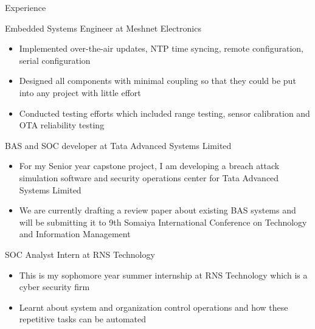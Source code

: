\documentclass{article}
\newlength{\tabin}
\newlength{\secsep}
\newcommand{\lineunder}{\vspace*{-8pt} \\ \hspace*{-6pt} \hrulefill \\ \vspace*{-15pt}}
\newenvironment{tabbedsection}[1]{
	\begin{list}{}{
		\setlength{\itemsep}{0pt}
		\setlength{\labelsep}{0pt}
		\setlength{\labelwidth}{0pt}
		\setlength{\leftmargin}{\tabin}
		\setlength{\rightmargin}{\tabin}
		\setlength{\listparindent}{0pt}
		\setlength{\parsep}{0pt}
		\setlength{\parskip}{0pt}
		\setlength{\partopsep}{0pt}
		\setlength{\topsep}{#1}
	}
	\item[]
}{\end{list}}
\newenvironment{resume_section}[1]{
	\filbreak
	\vspace{2\secsep}
	\textsc{\large#1}
	\lineunder
	\begin{tabbedsection}{\secsep}
}{\end{tabbedsection}}
\newenvironment{resume_subsection}[2][]{
	\textbf{#2} \hfill {\footnotesize #1} \hspace{2em}
	\begin{tabbedsection}{0.5\secsep}
}{\end{tabbedsection}}
\newenvironment{subitems}{
	\renewcommand{\labelitemi}{-}
	\begin{itemize}
		\setlength{\labelsep}{1em}
}{\end{itemize}}
\begin{document}
\begin{resume_section}{Experience}

	\begin{resume_subsection}{Embedded Systems Engineer at Meshnet Electronics}
		\begin{subitems}
			\item   Implemented over-the-air updates, NTP time
				syncing, remote configuration, serial
				configuration
			\item   Designed all components with minimal coupling
				so that they could be put into any project with
				little effort
			\item   Conducted testing efforts which included range
				testing, sensor calibration and OTA reliability
				testing
		\end{subitems}
	\end{resume_subsection}

	\begin{resume_subsection}{BAS and SOC developer at Tata Advanced Systems Limited}
		\begin{subitems}
		\item For my Senior year capstone project, I am developing a
			breach attack simulation software and security
			operations center for Tata Advanced Systems Limited
		\item We are currently drafting a review paper about existing
			BAS systems and will be submitting it to 9th Somaiya
			International Conference on Technology and Information
			Management
		\end{subitems}
	\end{resume_subsection}

	\begin{resume_subsection}{SOC Analyst Intern at RNS Technology}
		\begin{subitems}
		\item This is my sophomore year summer internship at RNS Technology
			which is a cyber security firm
		\item Learnt about system and organization control operations and
			how these repetitive tasks can be automated
		\end{subitems}
	\end{resume_subsection}

\end{resume_section}
\end{document}
